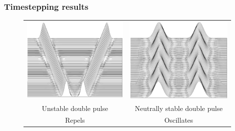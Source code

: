 \documentclass[16pt]{beamer}
\begin{document}
\begin{frame}
	\frametitle{Timestepping results}
	\fontsize{14}{7.2}\selectfont
	\begin{figure}[H]
	\begin{center}
	\begin{tabular}{cc}
	\includegraphics[width=0.4\linewidth]{images/waterfallunstable.eps} &
	\includegraphics[width=0.4\linewidth]{images/waterfallstable.eps} \\
	Unstable double pulse & Neutrally stable double pulse \\
	Repels & Oscillates
	\end{tabular}
	\end{center}
	\end{figure}
\end{frame}
 
\end{document}
